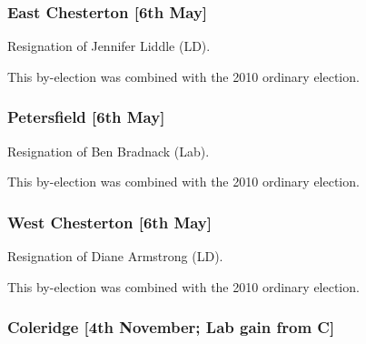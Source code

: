 \begin{resultsiii}
\subsubsection*{East Chesterton \hspace*{\fill}\nolinebreak[1]%
\enspace\hspace*{\fill}
[6th May]}


Resignation of Jennifer Liddle (LD).

This by-election was combined with the 2010 ordinary election.

\subsubsection*{Petersfield \hspace*{\fill}\nolinebreak[1]%
\enspace\hspace*{\fill}
[6th May]}


Resignation of Ben Bradnack (Lab).

This by-election was combined with the 2010 ordinary election.

\subsubsection*{West Chesterton \hspace*{\fill}\nolinebreak[1]%
\enspace\hspace*{\fill}
[6th May]}


Resignation of Diane Armstrong (LD).

This by-election was combined with the 2010 ordinary election.

\subsubsection*{Coleridge \hspace*{\fill}\nolinebreak[1]%
\enspace\hspace*{\fill}
[4th November; Lab gain from C]}


\end{resultsiii}
